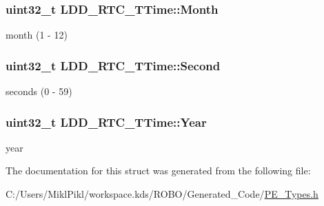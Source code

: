 \subsubsection[{Month}]{\setlength{\rightskip}{0pt plus 5cm}uint32\+\_\+t L\+D\+D\+\_\+\+R\+T\+C\+\_\+\+T\+Time\+::\+Month}\label{struct_l_d_d___r_t_c___t_time_a2de1da3c8e42665975c2469125b04dfd}
month (1 -\/ 12) \hypertarget{struct_l_d_d___r_t_c___t_time_ab6c770706c18542e856d56398850ac9e}{}
\subsubsection[{Second}]{\setlength{\rightskip}{0pt plus 5cm}uint32\+\_\+t L\+D\+D\+\_\+\+R\+T\+C\+\_\+\+T\+Time\+::\+Second}\label{struct_l_d_d___r_t_c___t_time_ab6c770706c18542e856d56398850ac9e}
seconds (0 -\/ 59) \hypertarget{struct_l_d_d___r_t_c___t_time_a16fbfb74b239e4b5e1889fe19d025d5e}{}
\subsubsection[{Year}]{\setlength{\rightskip}{0pt plus 5cm}uint32\+\_\+t L\+D\+D\+\_\+\+R\+T\+C\+\_\+\+T\+Time\+::\+Year}\label{struct_l_d_d___r_t_c___t_time_a16fbfb74b239e4b5e1889fe19d025d5e}
year 

The documentation for this struct was generated from the following file\+:\begin{DoxyCompactItemize}
\item 
C\+:/\+Users/\+Mikl\+Pikl/workspace.\+kds/\+R\+O\+B\+O/\+Generated\+\_\+\+Code/\hyperlink{_p_e___types_8h}{P\+E\+\_\+\+Types.\+h}\end{DoxyCompactItemize}
